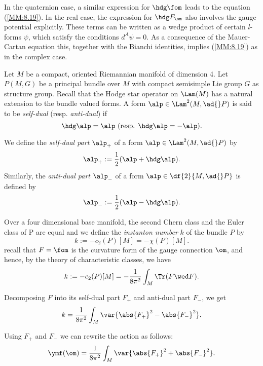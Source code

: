 In the quaternion case, a similar expression for $\hdg \fom$ leads to the equation (\ref{MM:8.19}). In the real case,
the expression for $\hdg F_{\om}$ also involves the gauge potential explicitly. These terms can be written as a wedge
product of certain $l$-forms $\psi$, which satisfy the conditions $d^{A}\psi=0$. As a consequence of the Mauer-Cartan
equation this, together with the Bianchi identities, implies (\ref{MM:8.19}) as in the complex case.

Let $M$ be a compact, oriented Riemannian manifold of dimension 4. Let $P(M, G)$ be a principal bundle over $M$ with
compact semisimple Lie group $G$ as  structure group. Recall that the Hodge star operator on $\Lam(M)$ has a natural
extension to the bundle valued forms. A form $\alp \in \Lam^{2}(M, \ad{}P)$ is said to be \emph{self-dual} (resp.
\emph{anti-dual}) if
$$
\hdg \alp = \alp \ (\text{resp. } \hdg \alp = - \alp).
$$

We define the \emph{self-dual part} $\alp_{+}$ of a form $\alp \in \Lam^{2}(M, \ad{} P)$ by
$$
\alp_{+}:= \frac{1}{2}(\alp + \hdg \alp).
$$
Similarly, the \emph{anti-dual part} $\alp_{-}$ of a form $\alp \in \df{2}{M, \ad{ }P}$ is defined by
$$
\alp_{-}:= \frac{1}{2}(\alp - \hdg \alp).
$$

Over a four dimensional base manifold, the second Chern class and the Euler class of P are equal and we define the
\emph{instanton number} $k$ of the bundle $P$ by
\begin{equation}
 \label{MM:8.20}
 k:= -c_{2}(P)[M]= - \chi(P)[M].
\end{equation}
recall that $F=\fom$ is the curvature form of the gauge connection $\om$, and hence, by the theory of characteristic
classes, we have
\begin{equation}
 \label{MM:8.21}
 k:=-c_{2}(P)[M] = -\frac{1}{8\pi^{2}} \int_{M} \Tr(F \wed F).
\end{equation}

Decomposing $F$ into its self-dual part $F_{+}$ and anti-dual part $F_{-}$, we get
\begin{equation}
\label{MM:8.22}
 k=\frac{1}{8\pi^{2}}\int_{M}\var{\abs{F_{+}}^{2}-\abs{F_{-}}^{2}}.
\end{equation}

Using $F_{+}$ and $F_{-}$ we can rewrite the \ym action  as follows:
\begin{equation}
 \label{MM:8.23}
 \ymf(\om)=\frac{1}{8\pi^{2}}\int_{M}\var{\abs{F_{+}}^{2}+\abs{F_{-}}^{2}}.
\end{equation}

